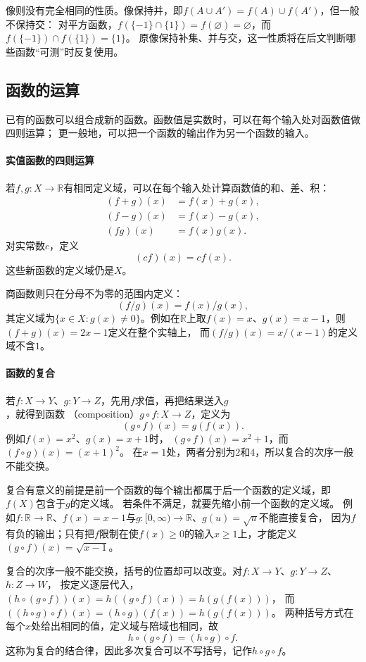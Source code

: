 像则没有完全相同的性质。像保持并，即$f(A\cup A')=f(A)\cup f(A')$，但一般不保持交：
对平方函数，$f(\{-1\}\cap\{1\})=f(\varnothing)=\varnothing$，而$f(\{-1\})\cap f(\{1\})=\{1\}$。
原像保持补集、并与交，这一性质将在后文判断哪些函数“可测”时反复使用。

\subsection{函数的运算}
\label{sec:prelim-map-operations}

已有的函数可以组合成新的函数。函数值是实数时，可以在每个输入处对函数值做四则运算；
更一般地，可以把一个函数的输出作为另一个函数的输入。

\paragraph{实值函数的四则运算}
若$f,g:X\to\mathbb R$有相同定义域，可以在每个输入处计算函数值的和、差、积：
\[
 \begin{aligned}
 (f+g)(x)&=f(x)+g(x),\\
 (f-g)(x)&=f(x)-g(x),\\
 (fg)(x)&=f(x)g(x).
 \end{aligned}
\]
对实常数$c$，定义
\[
  (cf)(x)=cf(x).
\]
这些新函数的定义域仍是$X$。

商函数则只在分母不为零的范围内定义：
\[
  (f/g)(x)=f(x)/g(x),
\]
其定义域为$\{x\in X:g(x)\neq0\}$。例如在$\mathbb R$上取$f(x)=x$、$g(x)=x-1$，则$(f+g)(x)=2x-1$定义在整个实轴上，
而$(f/g)(x)=x/(x-1)$的定义域不含$1$。

\paragraph{函数的复合}
若$f:X\to Y$、$g:Y\to Z$，先用$f$求值，再把结果送入$g$，就得到函数
（composition）$g\circ f:X\to Z$，定义为
\[
 (g\circ f)(x)=g(f(x)).
\]
例如$f(x)=x^2$、$g(x)=x+1$时，
$(g\circ f)(x)=x^2+1$，而$(f\circ g)(x)=(x+1)^2$。
在$x=1$处，两者分别为$2$和$4$，所以复合的次序一般不能交换。

复合有意义的前提是前一个函数的每个输出都属于后一个函数的定义域，即$f(X)$包含于$g$的定义域。
若条件不满足，就要先缩小前一个函数的定义域。
例如$f:\mathbb R\to\mathbb R$、$f(x)=x-1$与$g:[0,\infty)\to\mathbb R$、$g(u)=\sqrt u$不能直接复合，
因为$f$有负的输出；只有把$f$限制在使$f(x)\geq0$的输入$x\geq1$上，才能定义$(g\circ f)(x)=\sqrt{x-1}$。

复合的次序一般不能交换，括号的位置却可以改变。对$f:X\to Y$、$g:Y\to Z$、$h:Z\to W$，
按定义逐层代入，$(h\circ(g\circ f))(x)=h((g\circ f)(x))=h(g(f(x)))$，
而$((h\circ g)\circ f)(x)=(h\circ g)(f(x))=h(g(f(x)))$。
两种括号方式在每个$x$处给出相同的值，定义域与陪域也相同，故
\[
 h\circ(g\circ f)=(h\circ g)\circ f.
\]
这称为复合的结合律，因此多次复合可以不写括号，记作$h\circ g\circ f$。

